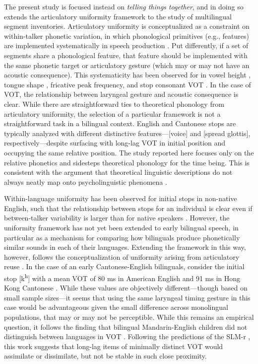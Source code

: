 The present study is focused instead on \textit{telling things together}, and in doing so extends the articulatory uniformity framework to the study of multilingual segment inventories. Articulatory uniformity is conceptualized as a constraint on within-talker phonetic variation, in which phonological primitives (e.g., features) are implemented systematically in speech production \citep{chodroff_2017_structure,faytak_2018_uniformity,menard_2008_invariance}. Put differently, if a set of segments share a phonological feature, that feature should be implemented with the same phonetic target or articulatory gesture (which may or may not have an acoustic consequence). This systematicity has been observed for in vowel height \citep{menard_2008_invariance}, tongue shape \citep{faytak_2018_uniformity}, fricative peak frequency, and stop consonant VOT \citep{chodroff_2017_structure}. In the case of VOT, the relationship between laryngeal gesture and acoustic consequence is clear. While there are straightforward ties to theoretical phonology from articulatory uniformity, the selection of a particular framework is not a straightforward task in a bilingual context. English and Cantonese stops are typically analyzed with different distinctive features---[voice] and [spread glottis], respectively---despite surfacing with long-lag VOT in initial position and occupying the same relative position. The study reported here focuses only on the relative phonetics and sidesteps theoretical phonology for the time being. This is consistent with the argument that theoretical linguistic descriptions do not always neatly map onto psycholinguistic phenomena \citep{samuel_2020_resist}. %

Within-language uniformity has been observed for initial stops in non-native English, such that the relationship between stops for an individual is clear even if between-talker variability is larger than for native speakers \citep{chodroff_2019_l2}. However, the uniformity framework has not yet been extended to early bilingual speech, in particular as a mechanism for comparing how bilinguals produce phonetically similar sounds in each of their languages. Extending the framework in this way, however, follows the conceptualization of uniformity arising from articulatory reuse \citep{faytak_2018_uniformity}. In the case of an early Cantonese-English bilinguals, consider the initial stop [k\textsuperscript{h}] with a mean VOT of 80 ms in American English \citep{lisker_1964_vot} and 91 ms in Hong Kong Cantonese \citep{clumeck_1981_cantonese}. While these values are objectively different---though based on small sample sizes---it seems that using the same laryngeal timing gesture in this case would be advantageous given the small difference across monolingual populations, that may or may not be perceptible. While this remains an empirical question, it follows the finding that bilingual Mandarin-English children did not distinguish between languages in VOT \citep{yang_2019_vot}. Following the predictions of the SLM-r \citep{flege_2021_slmr}, this work suggests that long-lag items of minimally distinct VOT would assimilate or dissimilate, but not be stable in such close proximity. 

